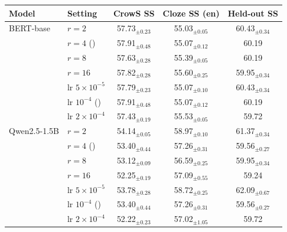   \footnotesize\setlength{\tabcolsep}{4pt}
  \begin{tabular}{@{}llccc@{}}
    \toprule
    Model & Setting & CrowS SS & Cloze SS (en) & Held-out SS \\
    \midrule
    BERT-base & $r=2$ & 57.73$_{\pm 0.23}$ & 55.03$_{\pm 0.05}$ & 60.43$_{\pm 0.34}$ \\
     & $r=4$ (\PEAT{}) & 57.91$_{\pm 0.48}$ & 55.07$_{\pm 0.12}$ & 60.19 \\
     & $r=8$ & 57.63$_{\pm 0.28}$ & 55.39$_{\pm 0.05}$ & 60.19 \\
     & $r=16$ & 57.82$_{\pm 0.28}$ & 55.60$_{\pm 0.25}$ & 59.95$_{\pm 0.34}$ \\
     & lr $5\times10^{-5}$ & 57.79$_{\pm 0.23}$ & 55.07$_{\pm 0.10}$ & 60.43$_{\pm 0.34}$ \\
     & lr $10^{-4}$ (\PEAT{}) & 57.91$_{\pm 0.48}$ & 55.07$_{\pm 0.12}$ & 60.19 \\
     & lr $2\times10^{-4}$ & 57.43$_{\pm 0.19}$ & 55.53$_{\pm 0.05}$ & 59.72 \\
    \midrule
    Qwen2.5-1.5B & $r=2$ & 54.14$_{\pm 0.05}$ & 58.97$_{\pm 0.10}$ & 61.37$_{\pm 0.34}$ \\
     & $r=4$ (\PEAT{}) & 53.40$_{\pm 0.44}$ & 57.26$_{\pm 0.31}$ & 59.56$_{\pm 0.27}$ \\
     & $r=8$ & 53.12$_{\pm 0.09}$ & 56.59$_{\pm 0.25}$ & 59.95$_{\pm 0.34}$ \\
     & $r=16$ & 52.25$_{\pm 0.19}$ & 57.09$_{\pm 0.55}$ & 59.24 \\
     & lr $5\times10^{-5}$ & 53.78$_{\pm 0.28}$ & 58.72$_{\pm 0.25}$ & 62.09$_{\pm 0.67}$ \\
     & lr $10^{-4}$ (\PEAT{}) & 53.40$_{\pm 0.44}$ & 57.26$_{\pm 0.31}$ & 59.56$_{\pm 0.27}$ \\
     & lr $2\times10^{-4}$ & 52.22$_{\pm 0.23}$ & 57.02$_{\pm 1.05}$ & 59.72 \\
    \bottomrule
  \end{tabular}
